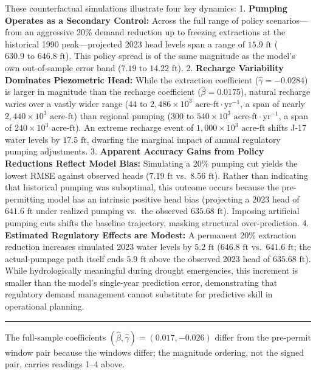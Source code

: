 \documentclass[11pt]{article}
\begin{document}
These counterfactual simulations illustrate four key dynamics: 1.
\textbf{Pumping Operates as a Secondary Control:} Across the full range
of policy scenarios---from an aggressive 20\% demand reduction up to
freezing extractions at the historical 1990 peak---projected 2023 head
levels span a range of \(15.9\text{ ft}\)
(\(630.9\text{ to } 646.8\text{ ft}\)). This policy spread is of the
same magnitude as the model's own out-of-sample error band
(\(7.19\text{ to } 14.22\text{ ft}\)). 2. \textbf{Recharge Variability
Dominates Piezometric Head:} While the extraction coefficient
(\(\hat{\gamma} = -0.0284\)) is larger in magnitude than the recharge
coefficient (\(\hat{\beta} = 0.0175\)), natural recharge varies over a
vastly wider range
(\(44\text{ to } 2,486 \times 10^3\text{ acre-ft}\cdot\text{yr}^{-1}\),
a span of nearly \(2,440 \times 10^3\text{ acre-ft}\)) than regional
pumping
(\(300\text{ to } 540 \times 10^3\text{ acre-ft}\cdot\text{yr}^{-1}\), a
span of \(240 \times 10^3\text{ acre-ft}\)). An extreme recharge event
of \(1,000 \times 10^3\text{ acre-ft}\) shifts J-17 water levels by
\(17.5\text{ ft}\), dwarfing the marginal impact of annual regulatory
pumping adjustments. 3. \textbf{Apparent Accuracy Gains from Policy
Reductions Reflect Model Bias:} Simulating a 20\% pumping cut yields the
lowest RMSE against observed heads (\(7.19\text{ ft}\)
vs.~\(8.56\text{ ft}\)). Rather than indicating that historical pumping
was suboptimal, this outcome occurs because the pre-permitting model has
an intrinsic positive head bias (projecting a 2023 head of
\(641.6\text{ ft}\) under realized pumping vs.~the observed
\(635.68\text{ ft}\)). Imposing artificial pumping cuts shifts the
baseline trajectory, masking structural over-prediction. 4.
\textbf{Estimated Regulatory Effects are Modest:} A permanent 20\%
extraction reduction increases simulated 2023 water levels by
\(5.2\text{ ft}\) (\(646.8\text{ ft}\) vs.~\(641.6\text{ ft}\); the
actual-pumpage path itself ends \(5.9\text{ ft}\) above the observed
2023 head of \(635.68\text{ ft}\)). While hydrologically meaningful
during drought emergencies, this increment is smaller than the model's
single-year prediction error, demonstrating that regulatory demand
management cannot substitute for predictive skill in operational
planning.

\begin{center}\rule{0.5\linewidth}{0.5pt}\end{center}

The full-sample coefficients
\((\hat{\beta}, \hat{\gamma}) = (0.017, -0.026)\) differ from the
pre-permit window pair because the windows differ; the magnitude
ordering, not the signed pair, carries readings 1--4 above.
\end{document}
